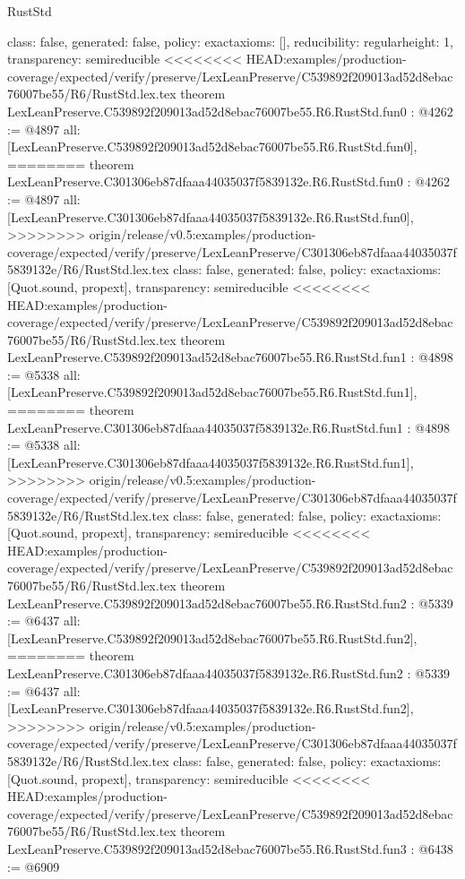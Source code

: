 \begin{lexlean}{RustStd}
\begin{coremodule}
{\begin{coremodule}
{{{  class: false,
  generated: false,
  policy: exact{axioms: []},
  reducibility: regular{height: 1},
  transparency: semireducible
}
<<<<<<<< HEAD:examples/production-coverage/expected/verify/preserve/LexLeanPreserve/C539892f209013ad52d8ebac76007be55/R6/RustStd.lex.tex
theorem LexLeanPreserve.C539892f209013ad52d8ebac76007be55.R6.RustStd.fun0 : @4262 := @4897 {
  all: [LexLeanPreserve.C539892f209013ad52d8ebac76007be55.R6.RustStd.fun0],
========
theorem LexLeanPreserve.C301306eb87dfaaa44035037f5839132e.R6.RustStd.fun0 : @4262 := @4897 {
  all: [LexLeanPreserve.C301306eb87dfaaa44035037f5839132e.R6.RustStd.fun0],
>>>>>>>> origin/release/v0.5:examples/production-coverage/expected/verify/preserve/LexLeanPreserve/C301306eb87dfaaa44035037f5839132e/R6/RustStd.lex.tex
  class: false,
  generated: false,
  policy: exact{axioms: [Quot.sound, propext]},
  transparency: semireducible
}
<<<<<<<< HEAD:examples/production-coverage/expected/verify/preserve/LexLeanPreserve/C539892f209013ad52d8ebac76007be55/R6/RustStd.lex.tex
theorem LexLeanPreserve.C539892f209013ad52d8ebac76007be55.R6.RustStd.fun1 : @4898 := @5338 {
  all: [LexLeanPreserve.C539892f209013ad52d8ebac76007be55.R6.RustStd.fun1],
========
theorem LexLeanPreserve.C301306eb87dfaaa44035037f5839132e.R6.RustStd.fun1 : @4898 := @5338 {
  all: [LexLeanPreserve.C301306eb87dfaaa44035037f5839132e.R6.RustStd.fun1],
>>>>>>>> origin/release/v0.5:examples/production-coverage/expected/verify/preserve/LexLeanPreserve/C301306eb87dfaaa44035037f5839132e/R6/RustStd.lex.tex
  class: false,
  generated: false,
  policy: exact{axioms: [Quot.sound, propext]},
  transparency: semireducible
}
<<<<<<<< HEAD:examples/production-coverage/expected/verify/preserve/LexLeanPreserve/C539892f209013ad52d8ebac76007be55/R6/RustStd.lex.tex
theorem LexLeanPreserve.C539892f209013ad52d8ebac76007be55.R6.RustStd.fun2 : @5339 := @6437 {
  all: [LexLeanPreserve.C539892f209013ad52d8ebac76007be55.R6.RustStd.fun2],
========
theorem LexLeanPreserve.C301306eb87dfaaa44035037f5839132e.R6.RustStd.fun2 : @5339 := @6437 {
  all: [LexLeanPreserve.C301306eb87dfaaa44035037f5839132e.R6.RustStd.fun2],
>>>>>>>> origin/release/v0.5:examples/production-coverage/expected/verify/preserve/LexLeanPreserve/C301306eb87dfaaa44035037f5839132e/R6/RustStd.lex.tex
  class: false,
  generated: false,
  policy: exact{axioms: [Quot.sound, propext]},
  transparency: semireducible
}
<<<<<<<< HEAD:examples/production-coverage/expected/verify/preserve/LexLeanPreserve/C539892f209013ad52d8ebac76007be55/R6/RustStd.lex.tex
theorem LexLeanPreserve.C539892f209013ad52d8ebac76007be55.R6.RustStd.fun3 : @6438 := @6909 {
}}}}}}
\end{coremodule}}
\end{coremodule}
\end{lexlean}
